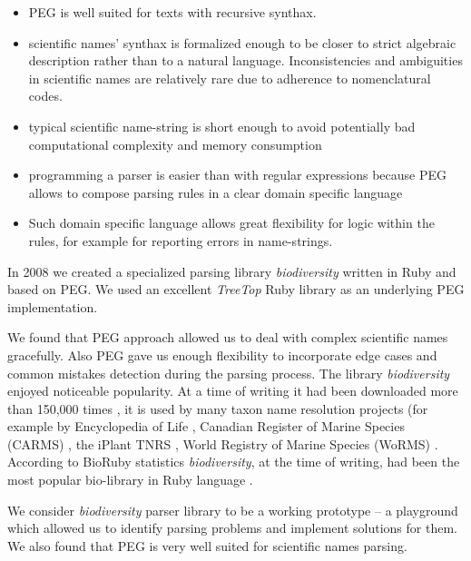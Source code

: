 \documentclass{bmcart}
\begin{document}
\begin{itemize}

  \item PEG is well suited for texts with recursive synthax.

  \item scientific names' synthax is formalized enough to be closer to strict
    algebraic description rather than to a natural language. Inconsistencies
    and ambiguities in scientific names are relatively rare due to adherence to
    nomenclatural codes.

  \item typical scientific name-string is short enough to avoid potentially
    bad computational complexity and memory consumption

  \item programming a parser is easier than with regular
    expressions because PEG allows to compose parsing rules in a clear domain
    specific language

  \item Such domain specific language allows great flexibility for logic within
    the rules, for example for reporting errors in name-strings.

\end{itemize}

In 2008 we created a specialized parsing library \textit{biodiversity}
\cite{biodiversity} written in Ruby and based on PEG. We used an excellent
\textit{TreeTop} Ruby library \cite{treetop} as an underlying PEG
implementation.

We found that PEG approach allowed us to deal with complex scientific names
gracefully. Also PEG gave us enough flexibility to incorporate edge cases and
common mistakes detection during the parsing process. The library
\textit{biodiversity} enjoyed noticeable popularity. At a time of writing it
had been downloaded more than 150,000 times \cite{bdiv-downloads}, it is used
by many taxon name resolution projects (for example by Encyclopedia of Life
\cite{eol}, Canadian Register of Marine Species (CARMS) \cite{carms}, the
iPlant TNRS \cite{iplant}, World Registry of Marine Species (WoRMS)
\cite{worms}.  According to BioRuby statistics \textit{biodiversity}, at the
time of writing, had been the most popular bio-library in Ruby language
\cite{biogems}.

We consider \textit{biodiversity} parser library to be a working prototype -- a
playground which allowed us to identify parsing problems and implement
solutions for them. We also found that PEG is very well suited for scientific
names parsing.
\end{document}
